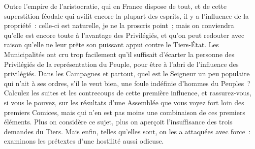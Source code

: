 \documentclass[french,twoside]{book} %
\begin{document}
Outre l’empire de l’aristocratie, qui en France dispose de tout, et de cette superstition féodale qui avilit encore la plupart des esprits, il y a l’influence de la propriété : celle-ci est naturelle, je ne la proscris point ; mais on conviendra qu’elle est encore toute à l’avantage des Privilégiés, et qu’on peut redouter avec raison qu’elle ne leur prête son puissant appui contre le Tiers-État. Les Municipalités ont cru trop facilement qu’il suffisait d’écarter la personne des Privilégiés de la représentation du Peuple, pour être à l’abri de l’influence des privilégiés. Dans les Campagnes et partout, quel est le Seigneur un peu populaire qui n’ait à ses ordres, s’il le veut bien, une foule indéfinie d’hommes du Peuples ? Calculez les suites et les contrecoups de cette première influence, et rassurez-vous, si vous le pouvez, sur les résultats d’une Assemblée que vous voyez fort loin des premiers Comices, mais qui n’en est pas moins une combinaison de ces premiers éléments. Plus on considère ce sujet, plus on aperçoit l’insuffisance des trois demandes du Tiers. Mais enfin, telles qu’elles sont, on les a attaquées avec force : examinons les prétextes d’une hostilité aussi odieuse.\par
\end{document}
